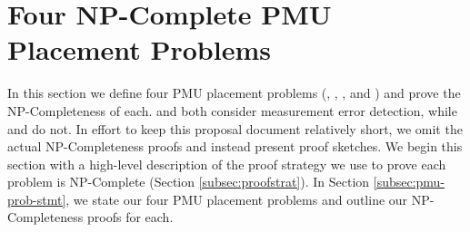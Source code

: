 \section{Four NP-Complete PMU Placement Problems}
\label{sec:problem-analysis}


In this section we define four PMU placement problems (\fulls, \maxincs, \xvals, and \xvalparts) and prove the NP-Completeness of each.  \xval and \xvalpart both consider measurement error detection, while
\full and \maxinc do not.  In effort to keep this proposal document relatively short, we omit the actual NP-Completeness proofs and instead present proof sketches.  We begin this section with a high-level description of the proof strategy we
use to prove each problem is NP-Complete (Section \ref{subsec:proofstrat}).  In Section \ref{subsec:pmu-prob-stmt}, we state our four PMU placement problems and outline our NP-Completeness proofs for each.


